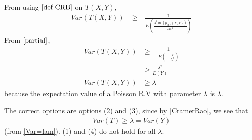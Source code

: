 \documentclass{beamer}
\providecommand{\brak}[1]{\ensuremath{\left(#1\right)}}
\begin{document}
\begin{frame}{}
From using $\eqref{def CRB}$ on $T(X,Y)$,
\begin{align}
    Var(T(X, Y))&\geq -\frac{1}{E\brak{\frac{\partial^2 \ln(p_{XY}\brak{X, Y})}{\partial\lambda^2}}}
\end{align}
From $\eqref{partial}$,
\begin{align}
     Var(T(X, Y))&\geq-\frac{1}{E\brak{-\frac{Y}{\lambda^2}}}\\
    &\geq\frac{\lambda^2}{E\brak{Y}}\\
    Var(T(X, Y))&\geq \lambda \label{CramerRao}
\end{align}
because the expectation value of a Poisson R.V with parameter $\lambda$ is $\lambda$.
    
\end{frame}
\begin{frame}{}
    The correct options are options (2) and (3), since by \eqref{CramerRao}, we see that 
\begin{align*}
Var(T) \geq \lambda=Var(Y)
\end{align*}
(from \eqref{Var=lam}). (1) and (4) do not hold for all $\lambda$. 
    
\end{frame}
\end{document}

